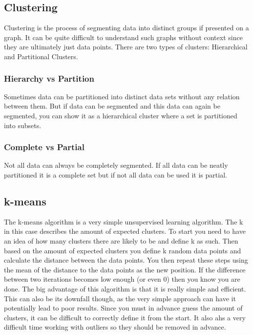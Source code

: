 \documentclass{article}
\begin{document}
	\subsection{Clustering}
	Clustering is the process of segmenting data into distinct groups if presented on a graph. It can be quite difficult to understand such graphs without context since they are ultimately just data points. There are two types of clusters: Hierarchical and Partitional Clusters.
	\subsubsection{Hierarchy vs Partition}
	Sometimes data can be partitioned into distinct data sets without any relation between them. But if data can be segmented and this data can again be segmented, you can show it as a hierarchical cluster where a set is partitioned into subsets.
	\subsubsection{Complete vs Partial}
	Not all data can always be completely segmented. If all data can be neatly partitioned it is a complete set but if not all data can be used it is partial.
	\subsection{k-means}
	The k-means algorithm is a very simple unsupervised learning algorithm. The k in this case describes the amount of expected clusters. To start you need to have an idea of how many clusters there are likely to be and define k as such. Then based on the amount of expected clusters you define k random data points and calculate the distance between the data points. You then repeat these steps using the mean of the distance to the data points as the new position. If the difference between two iterations becomes low enough (or even 0) then you know you are done. The big advantage of this algorithm is that it is really simple and efficient. This can also be its downfall though, as the very simple approach can have it potentially lead to poor results. Since you must in advance guess the amount of clusters, it can be difficult to correctly define it from the start. It also ahs a very difficult time working with outliers so they should be removed in advance.
\end{document}
